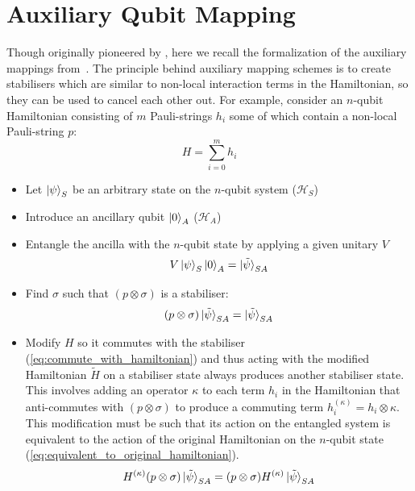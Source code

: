 \section{Auxiliary Qubit Mapping}
\label{section:auxillaryMappings}
Though originally pioneered by \cite{Verstraete_2005}, here we recall the formalization of the auxiliary mappings from~\cite{steudtner2019quantum}. The principle behind auxiliary mapping schemes is to create stabilisers which are similar to non-local interaction terms in the Hamiltonian, so they can be used to cancel each other out. For example, consider an $n$-qubit Hamiltonian consisting of $m$ Pauli-strings $h_i$ some of which contain a non-local Pauli-string $p$:
\begin{equation}
    H = \sum_{i=0}^m h_i
\end{equation}
\begin{itemize}
\item Let $\ket{\psi}_S$ be an arbitrary state on the $n$-qubit system ($\mathcal{H}_S$)
\item Introduce an ancillary qubit $\ket{0}_A$ ($\mathcal{H}_A$)
\item Entangle the ancilla with the $n$-qubit state by applying a given unitary $V$
\begin{equation}
    V \ket{\psi}_S \ket{0}_A = \ket{\tilde \psi}_{SA}
\end{equation}
\item Find $\sigma$ such that $(p \otimes \sigma)$ is a stabiliser:
\begin{equation}
    (p \otimes \sigma) \ket{\tilde \psi}_{SA} = \ket{\tilde \psi}_{SA}
\end{equation}
\item Modify $H$ so it commutes with the stabiliser (\ref{eq:commute_with_hamiltonian}) and thus acting with the modified Hamiltonian $\tilde H$ on a stabiliser state always produces another stabiliser state. This involves adding an operator $\kappa$ to each term $h_i$ in the Hamiltonian that anti-commutes with $(p \otimes \sigma)$ to produce a commuting term $h_i^{(\kappa)} = h_i \otimes \kappa$. This modification must be such that its action on the entangled system is equivalent to the action of the original Hamiltonian on the $n$-qubit state (\ref{eq:equivalent_to_original_hamiltonian}).
\begin{equation}
\label{eq:commute_with_hamiltonian}
    H^{(\kappa)}(p \otimes \sigma)  \ket{\tilde \psi}_{SA} =(p \otimes \sigma)  H^{(\kappa)}\ket{\tilde \psi}_{SA}  
\end{equation}

\end{itemize}
